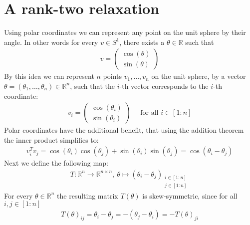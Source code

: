 \documentclass[12pt,a4paper]{article}
\theoremstyle{mythm}
\begin{document}
\section{A rank-two relaxation} 
\label{rankTworelaxation} 
Using polar coordinates we can represent any point on the unit sphere by their angle.
In other words for every $ v \in S^1 $, there exists a $ \theta \in \mathbb{R}  $ such that 
\begin{align*}
v = 
\begin{pmatrix}
\cos( \theta ) \\
\sin( \theta ) 
\end{pmatrix} 
\end{align*} 
By this idea we can represent $ n $ points $ v_1, \dots, v_n $ on the unit sphere, by a vector 
$ \theta = \left( \theta _{ 1 } , \dots, \theta _{ n }  \right) \in \mathbb{R} ^{ n }  $, such that 
the $ i $-th vector corresponds to the $ i $-th coordinate:
\begin{align}
\label{eq:polar} 
v_i = 
\begin{pmatrix}
\cos( \theta  _{ i } ) \\
\sin( \theta _{ i } ) 
\end{pmatrix} 
\quad \text{ for all } i \in \left[ 1:n \right] 
\end{align} 
Polar coordinates have the additional benefit, that using the addition theorem the inner product simplifies to:
\begin{align}
\label{eq:sp2cos} 
v_i ^{ T } v_j = \cos( \theta _{ i }  ) \cos( \theta _{ j }  ) + \sin( \theta _{ i }  ) \sin( \theta _{ j }  ) = \cos( \theta _{ i } - \theta _{ j }  ) 
\end{align} 
Next we define the following map: 
\begin{align*}
T  : \mathbb{R} ^{ n }  \to \mathbb{R} ^{ n \times n }  , \ \theta  \mapsto \left(  \theta _{ i } - \theta _{ j } \right)
_{ \substack{i \in \left[  1:n\right] \\ j \in \left[  1:n\right] } } 
\end{align*} 
For every $ \theta \in \mathbb{R} ^{ n }  $ the resulting matrix $ T \left( \theta \right)  $ is skew-symmetric, since for all $ i,j \in \left[ 1:n \right]  $
\begin{align*}
T (\theta) _{ ij } = \theta _{ i } - \theta _{ j } = - \left( \theta _{ j } - \theta _{ i }  \right) = - T (\theta) _{ ji } 
\end{align*} 
\end{document}
